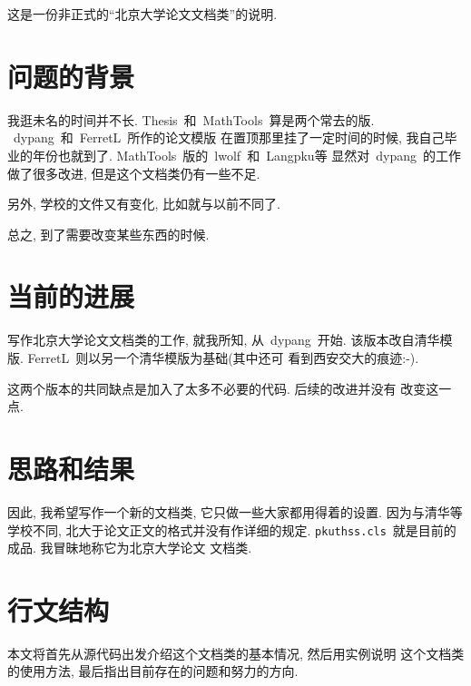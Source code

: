 \begin{introduction}

这是一份非正式的``北京大学论文文档类''的说明.

\section*{问题的背景}

我逛未名的时间并不长. Thesis~和~MathTools~算是两个常去的版.
~dypang\cite{dypang}~和~FerretL\cite{FerretL}~所作的论文模版
在置顶那里挂了一定时间的时候, 我自己毕业的年份也就到了.
MathTools~版的~lwolf\cite{lwolf}~和~Langpku\cite{Langpku}等
显然对~dypang~的工作做了很多改进, 但是这个文档类仍有一些不足.

另外, 学校的文件又有变化, 比如\cite{F11-2007}就与以前不同了.

总之, 到了需要改变某些东西的时候.

\section*{当前的进展}

写作北京大学论文文档类的工作, 就我所知, 从~dypang~开始.
该版本改自清华模版. FerretL~则以另一个清华模版为基础(其中还可
看到西安交大的痕迹:-).

这两个版本的共同缺点是加入了太多不必要的代码. 后续的改进并没有
改变这一点.

\section*{思路和结果}

因此, 我希望写作一个新的文档类, 它只做一些大家都用得着的设置.
因为与清华等学校不同, 北大于论文正文的格式并没有作详细的规定.
\verb|pkuthss.cls|~就是目前的成品. 我冒昧地称它为北京大学论文
文档类.

\section*{行文结构}

本文将首先从源代码出发介绍这个文档类的基本情况, 然后用实例说明
这个文档类的使用方法, 最后指出目前存在的问题和努力的方向.

\end{introduction}
